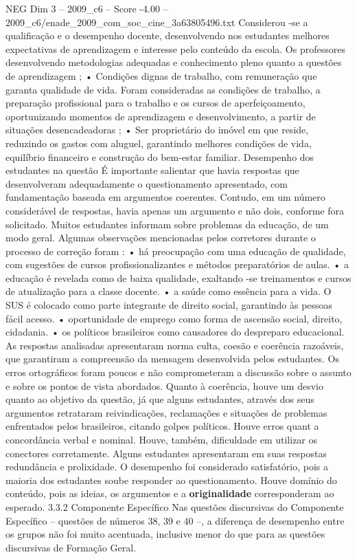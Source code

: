\begin{textsample}{NEG Dim 3 – 2009\_c6 – Score -4.00 – 2009\_c6/enade\_2009\_com\_soc\_cine\_3a63805496.txt}
Considerou -se a qualificação e o desempenho docente, desenvolvendo nos estudantes melhores expectativas de aprendizagem e interesse pelo conteúdo da escola.
Os professores desenvolvendo metodologias adequadas e conhecimento pleno quanto a questões de aprendizagem ; • Condições dignas de trabalho, com remuneração que garanta qualidade de vida.
Foram consideradas as condições de trabalho, a preparação profissional para o trabalho e os cursos de aperfeiçoamento, oportunizando momentos de aprendizagem e desenvolvimento, a partir de situações desencadeadoras ; • Ser proprietário do imóvel em que reside, reduzindo os gastos com aluguel, garantindo melhores condições de vida, equilíbrio financeiro e construção do bem-estar familiar.
Desempenho dos estudantes na questão É importante salientar que havia respostas que desenvolveram adequadamente o questionamento apresentado, com fundamentação baseada em argumentos coerentes.
Contudo, em um número considerável de respostas, havia apenas um argumento e não dois, conforme fora solicitado.
Muitos estudantes informam sobre problemas da educação, de um modo geral.
Algumas observações mencionadas pelos corretores durante o processo de correção foram : • há preocupação com uma educação de qualidade, com sugestões de cursos profissionalizantes e métodos preparatórios de aulas. • a educação é revelada como de baixa qualidade, exaltando -se treinamentos e cursos de atualização para a classe docente. • a saúde como essência para a vida.
O SUS é colocado como parte integrante de direito social, garantindo às pessoas fácil acesso. • oportunidade de emprego como forma de ascensão social, direito, cidadania. • os políticos brasileiros como causadores do despreparo educacional.
As respostas analisadas apresentaram norma culta, coesão e coerência razoáveis, que garantiram a compreensão da mensagem desenvolvida pelos estudantes.
Os erros ortográficos foram poucos e não comprometeram a discussão sobre o assunto e sobre os pontos de vista abordados.
Quanto à coerência, houve um desvio quanto ao objetivo da questão, já que alguns estudantes, através dos seus argumentos retrataram reivindicações, reclamações e situações de problemas enfrentados pelos brasileiros, citando golpes políticos.
Houve erros quant a concordância verbal e nominal.
Houve, também, dificuldade em utilizar os conectores corretamente.
Alguns estudantes apresentaram em suas respostas redundância e prolixidade.
O desempenho foi considerado satisfatório, pois a maioria dos estudantes soube responder ao questionamento.
Houve domínio do conteúdo, pois as ideias, os argumentos e a \textbf{originalidade} corresponderam ao esperado. 3.3.2 Componente Específico Nas questões discursivas do Componente Específico – questões de números 38, 39 e 40 –, a diferença de desempenho entre os grupos não foi muito acentuada, inclusive menor do que para as questões discursivas de Formação Geral.

\end{textsample}
